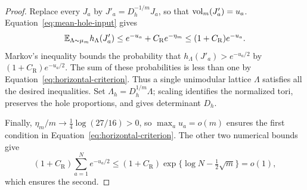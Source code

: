 \begin{proof}
Replace every $J_a$ by $J'_a=D_h^{-1/m}J_a$, so that
$\operatorname{vol}_m(J'_a)=u_a$.  Equation~\eqref{eq:mean-hole-input} gives
\[
 \mathbb E_{\Lambda\sim\mu_m}h_{\Lambda}(J'_a)
 \le e^{-u_a}+C_{\mathrm R}e^{-\eta_m}
 \le(1+C_{\mathrm R})e^{-u_a}.
\]
Markov's inequality bounds the probability that
$h_{\Lambda}(J'_a)>e^{-u_a/2}$ by
$(1+C_{\mathrm R})e^{-u_a/2}$.  The sum of these probabilities is less
than one by Equation~\eqref{eq:horizontal-criterion}.  Thus a single
unimodular lattice $\Lambda$ satisfies all the desired inequalities.
Set $\Lambda_h=D_h^{1/m}\Lambda$; scaling identifies the normalized
tori, preserves the hole proportions, and gives determinant $D_h$.

Finally, $\eta_m/m\to\tfrac14\log(27/16)>0$, so
$\max_a u_a=o(m)$ ensures the first condition in
Equation~\eqref{eq:horizontal-criterion}.  The other two numerical
bounds give
\[
 (1+C_{\mathrm R})\sum_{a=1}^N e^{-u_a/2}
 \le(1+C_{\mathrm R})\exp\{\log N-\tfrac12\sqrt m\}=o(1),
\]
which ensures the second.
\end{proof}
